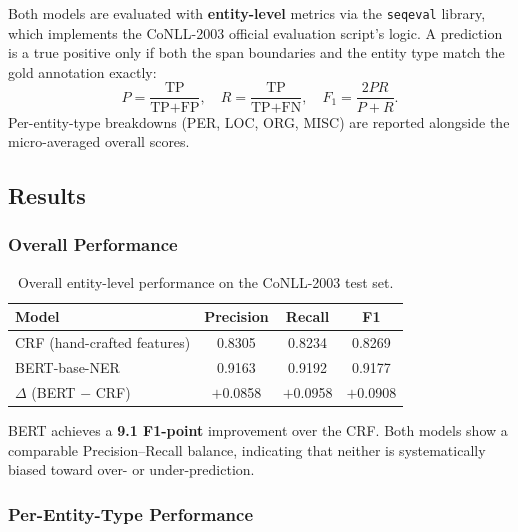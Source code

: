 \documentclass[11pt,a4paper]{article}
\begin{document}
Both models are evaluated with \textbf{entity-level} metrics via the
\texttt{seqeval} library, which implements the CoNLL-2003 official evaluation
script's logic. A prediction is a true positive only if both the span
boundaries and the entity type match the gold annotation exactly:
\[
P = \frac{\text{TP}}{\text{TP}+\text{FP}}, \quad
R = \frac{\text{TP}}{\text{TP}+\text{FN}}, \quad
F_1 = \frac{2PR}{P+R}.
\]
Per-entity-type breakdowns (PER, LOC, ORG, MISC) are reported alongside
the micro-averaged overall scores.

\subsection{Results}

\subsubsection{Overall Performance}

\begin{table}[H]
\centering
\caption{Overall entity-level performance on the CoNLL-2003 test set.}
\label{tab:q2-overall}
\begin{tabular}{lccc}
\toprule
\textbf{Model} & \textbf{Precision} & \textbf{Recall} & \textbf{F1} \\
\midrule
CRF (hand-crafted features) & 0.8305 & 0.8234 & 0.8269 \\
BERT-base-NER               & 0.9163 & 0.9192 & 0.9177 \\
\midrule
$\Delta$ (BERT $-$ CRF)     & $+$0.0858 & $+$0.0958 & $+$0.0908 \\
\bottomrule
\end{tabular}
\end{table}

BERT achieves a \textbf{9.1 F1-point} improvement over the CRF. Both models
show a comparable Precision--Recall balance, indicating that neither is
systematically biased toward over- or under-prediction.

\subsubsection{Per-Entity-Type Performance}
\end{document}
